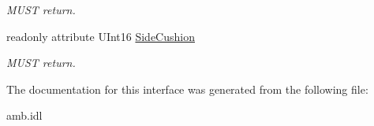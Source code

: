 \begin{DoxyCompactItemize}
\begin{DoxyCompactList}\small\item\em M\-U\-S\-T return. \end{DoxyCompactList}\item 
\hypertarget{interfaceVehicle_1_1org_1_1automotive_1_1SeatPosition_adb1d5bc5b0cfd19cf079f57c22fcbde4}{readonly attribute U\-Int16 \hyperlink{interfaceVehicle_1_1org_1_1automotive_1_1SeatPosition_adb1d5bc5b0cfd19cf079f57c22fcbde4}{Side\-Cushion}}\label{interfaceVehicle_1_1org_1_1automotive_1_1SeatPosition_adb1d5bc5b0cfd19cf079f57c22fcbde4}

\begin{DoxyCompactList}\small\item\em M\-U\-S\-T return. \end{DoxyCompactList}\end{DoxyCompactItemize}


The documentation for this interface was generated from the following file\-:\begin{DoxyCompactItemize}
\item 
amb.\-idl\end{DoxyCompactItemize}
